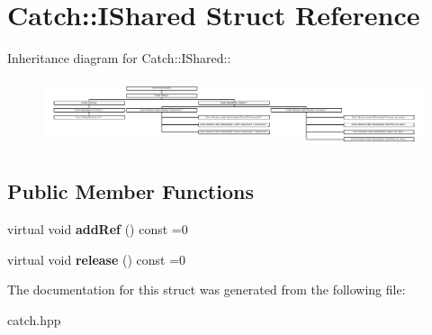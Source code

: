\hypertarget{structCatch_1_1IShared}{
\section{Catch::IShared Struct Reference}
\label{structCatch_1_1IShared}
}
Inheritance diagram for Catch::IShared::\begin{figure}[H]
\begin{center}
\leavevmode
\includegraphics[height=2.00447cm]{structCatch_1_1IShared}
\end{center}
\end{figure}
\subsection*{Public Member Functions}
\begin{DoxyCompactItemize}
\item 
\hypertarget{structCatch_1_1IShared_ae383df68557cdaf0910b411af04d9e33}{
virtual void {\bfseries addRef} () const =0}
\label{structCatch_1_1IShared_ae383df68557cdaf0910b411af04d9e33}

\item 
\hypertarget{structCatch_1_1IShared_a002f52624728a763956fb6f230cb2f57}{
virtual void {\bfseries release} () const =0}
\label{structCatch_1_1IShared_a002f52624728a763956fb6f230cb2f57}

\end{DoxyCompactItemize}


The documentation for this struct was generated from the following file:\begin{DoxyCompactItemize}
\item 
catch.hpp\end{DoxyCompactItemize}
